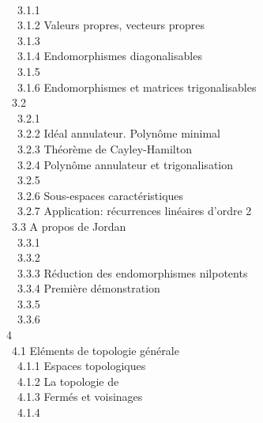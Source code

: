 \documentclass[]{article}
\begin{document}
\\ ~~3.1.1 
\\ ~~3.1.2 {Valeurs propres,
vecteurs propres} \\ ~~3.1.3
 \\
~~3.1.4 {Endomorphismes
diagonalisables} \\ ~~3.1.5
 \\
~~3.1.6 {Endomorphismes et
matrices trigonalisables} \\ ~3.2
 \\
~~3.2.1  \\ ~~3.2.2
{Idéal annulateur. Polynôme
minimal} \\ ~~3.2.3 {Théorème de
Cayley-Hamilton} \\ ~~3.2.4
{Polynôme annulateur et
trigonalisation} \\ ~~3.2.5
 \\
~~3.2.6 {Sous-espaces
caractéristiques} \\ ~~3.2.7
{Application: récurrences
linéaires d'ordre 2} \\ ~3.3 {A
propos de Jordan} \\ ~~3.3.1
 \\
~~3.3.2  \\ ~~3.3.3
{Réduction des endomorphismes
nilpotents} \\ ~~3.3.4 {Première
démonstration} \\ ~~3.3.5
 \\
~~3.3.6  \\ 4
 \\
~4.1 {Eléments de topologie
générale} \\ ~~4.1.1 {Espaces
topologiques} \\ ~~4.1.2 {La
topologie de ~} \\ ~~4.1.3 {Fermés
et voisinages} \\ ~~4.1.4
\end{document}

